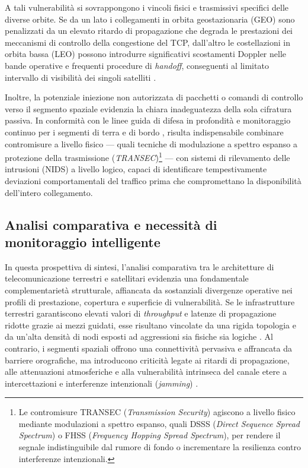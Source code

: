 A tali vulnerabilità si sovrappongono i vincoli fisici e trasmissivi specifici delle diverse orbite. 
Se da un lato i collegamenti in orbita geostazionaria (GEO) sono penalizzati da un elevato ritardo di propagazione che degrada le prestazioni dei meccanismi di controllo della congestione del TCP, dall'altro le costellazioni in orbita bassa (LEO) possono introdurre significativi scostamenti Doppler nelle bande operative e frequenti procedure di \textit{handoff}, conseguenti al limitato intervallo di visibilità dei singoli satelliti \cite{kodheli2021}.

Inoltre, la potenziale iniezione non autorizzata di pacchetti o comandi di controllo verso il segmento spaziale evidenzia la chiara inadeguatezza della sola cifratura passiva. 
In conformità con le linee guida di difesa in profondità e monitoraggio continuo per i segmenti di terra e di bordo \cite{nist2022}, risulta indispensabile combinare contromisure a livello fisico — quali tecniche di modulazione a spettro espanso a protezione della trasmissione (\textit{TRANSEC})\footnote{Le contromisure TRANSEC (\textit{Transmission Security}) agiscono a livello fisico mediante modulazioni a spettro espanso, quali DSSS (\textit{Direct Sequence Spread Spectrum}) o FHSS (\textit{Frequency Hopping Spread Spectrum}), per rendere il segnale indistinguibile dal rumore di fondo o incrementare la resilienza contro interferenze intenzionali.} — con sistemi di rilevamento delle intrusioni (NIDS) a livello logico, capaci di identificare tempestivamente deviazioni comportamentali del traffico prima che compromettano la disponibilità dell'intero collegamento.

\subsection{Analisi comparativa e necessità di monitoraggio intelligente}
\label{subsec:analisi_comparativa_monitoraggio}

In questa prospettiva di sintesi, l'analisi comparativa tra le architetture di telecomunicazione terrestri e satellitari evidenzia una fondamentale complementarietà strutturale, affiancata da sostanziali divergenze operative nei profili di prestazione, copertura e superficie di vulnerabilità. 
Se le infrastrutture terrestri garantiscono elevati valori di \textit{throughput} e latenze di propagazione ridotte grazie ai mezzi guidati, esse risultano vincolate da una rigida topologia e da un'alta densità di nodi esposti ad aggressioni sia fisiche sia logiche \cite{tanenbaum2020}. 
Al contrario, i segmenti spaziali offrono una connettività pervasiva e affrancata da barriere orografiche, ma introducono criticità legate ai ritardi di propagazione, alle attenuazioni atmosferiche e alla vulnerabilità intrinseca del canale etere a intercettazioni e interferenze intenzionali (\textit{jamming}) \cite{kodheli2021}.

